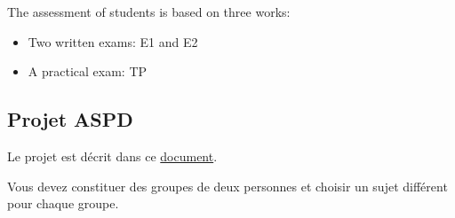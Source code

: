 \documentclass[ 12pt]{article}
\begin{document}
The assessment  of students is based on three works:
\begin{itemize}
\item Two  written  exams: E1 and E2
\item  A practical exam: TP
 \end{itemize}


  \subsection{Projet ASPD}
\label{sec:project}

Le  projet est décrit   dans ce     \href{http://mery54.github.io/teaching/aspd/lecturesnotes/projetaspd2025.pdf}{document}.

Vous devez  constituer des groupes de deux personnes   et choisir un
sujet  différent pour chaque groupe.





\end{document}
